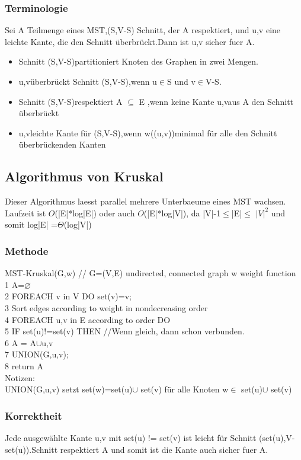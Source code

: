 \documentclass[jou,apacite]{apa6}
\begin{document}
\subsubsection{Terminologie}
Sei A Teilmenge eines MST,(S,V-S) Schnitt, der A respektiert, und {u,v} eine leichte Kante, die den Schnitt überbrückt.Dann ist {u,v} sicher fuer A.
\begin{itemize}
    \item Schnitt (S,V-S)partitioniert Knoten des Graphen in zwei Mengen. 
    \item {u,v}überbrückt Schnitt (S,V-S),wenn u$\in$S und v$\in$V-S. 
    \item Schnitt (S,V-S)respektiert A $\subseteq$ E ,wenn keine Kante {u,v}aus A den Schnitt überbrückt
    \item {u,v}leichte Kante für (S,V-S),wenn  w((u,v))minimal für alle den Schnitt überbrückenden Kanten
\end{itemize}

\subsection{Algorithmus von Kruskal}
Dieser Algorithmus laesst parallel mehrere Unterbaeume eines MST wachsen.\\
Laufzeit ist $O$(|E|*log|E|) oder auch $O$(|E|*log|V|), da |V|-1$\leq$|E|$\leq$ $|V|^{2}$ und somit log|E| =$\Theta$(log|V|)
\subsubsection{Methode}
MST-Kruskal(G,w) // G=(V,E) undirected, connected graph w weight function\\
1   A=$\varnothing$\\
2   FOREACH v in V DO set(v)={v};\\
3   Sort edges according to weight in nondecreasing order\\
4   FOREACH {u,v} in E according to order DO\\
5       IF set(u)!=set(v) THEN //Wenn gleich, dann schon verbunden.\\
6           A = A$\cup${{u,v}}\\
7           UNION(G,u,v);\\
8   return A\\
Notizen:\\
UNION(G,u,v) setzt set(w)=set(u)$\cup$ set(v) für alle Knoten  w$\in$ set(u)$\cup$ set(v)\\
\subsubsection{Korrektheit}
Jede ausgewählte Kante {u,v} mit set(u) != set(v) ist leicht für Schnitt (set(u),V-set(u)).Schnitt respektiert A und somit ist die Kante auch sicher fuer A.
\end{document}
